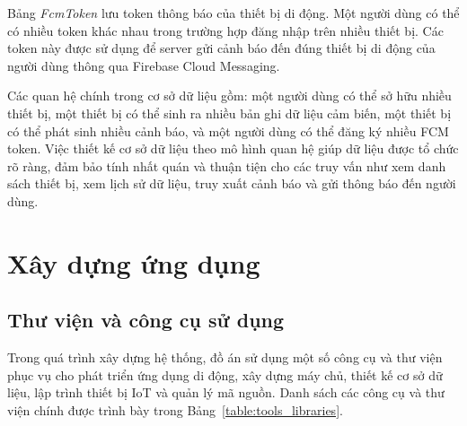\documentclass[../DoAn.tex]{subfiles}
\begin{document}
Bảng \textit{FcmToken} lưu token thông báo của thiết bị di động. Một người dùng có thể có nhiều token khác nhau trong trường hợp đăng nhập trên nhiều thiết bị. Các token này được sử dụng để server gửi cảnh báo đến đúng thiết bị di động của người dùng thông qua Firebase Cloud Messaging.

Các quan hệ chính trong cơ sở dữ liệu gồm: một người dùng có thể sở hữu nhiều thiết bị, một thiết bị có thể sinh ra nhiều bản ghi dữ liệu cảm biến, một thiết bị có thể phát sinh nhiều cảnh báo, và một người dùng có thể đăng ký nhiều FCM token. Việc thiết kế cơ sở dữ liệu theo mô hình quan hệ giúp dữ liệu được tổ chức rõ ràng, đảm bảo tính nhất quán và thuận tiện cho các truy vấn như xem danh sách thiết bị, xem lịch sử dữ liệu, truy xuất cảnh báo và gửi thông báo đến người dùng.


\section{Xây dựng ứng dụng}
\subsection{Thư viện và công cụ sử dụng}

Trong quá trình xây dựng hệ thống, đồ án sử dụng một số công cụ và thư viện phục vụ cho phát triển ứng dụng di động, xây dựng máy chủ, thiết kế cơ sở dữ liệu, lập trình thiết bị IoT và quản lý mã nguồn. Danh sách các công cụ và thư viện chính được trình bày trong Bảng~\ref{table:tools_libraries}.
\end{document}
